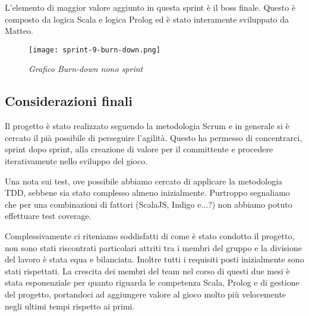 L'elemento di maggior valore aggiunto in questa sprint è il boss finale. Questo è composto da logica Scala e logica Prolog ed è stato interamente sviluppato da Matteo. 

\begin{figure}[H]
    \centering
    \texttt{[image: sprint-9-burn-down.png]}
    \caption{\textit{Grafico Burn-down nono sprint}} 
\end{figure}

\newpage
\subsection{Considerazioni finali}

Il progetto è stato realizzato seguendo la metodologia Scrum e in generale si è cercato il pià possibile di perseguire l'agilità. 
Questo ha permesso di concentrarci, sprint dopo sprint, alla creazione di valore per il committente e procedere iterativamente nello sviluppo del gioco. 

Una nota sui test, ove possibile abbiamo cercato di applicare la metodologia TDD, sebbene sia stato complesso almeno inizialmente. Purtroppo segnaliamo che per una combinazioni di fattori (ScalaJS, Indigo e...?) non abbiamo potuto effettuare test coverage. 

Complessivamente ci riteniamo soddisfatti di come è stato condotto il progetto, non sono stati riscontrati particolari attriti tra i membri del gruppo e la divisione del lavoro è stata equa e bilanciata.
Inoltre tutti i requisiti posti inizialmente sono stati rispettati.
La crescita dei membri del team nel corso di questi due mesi è stata esponenziale per quanto riguarda le competenza Scala, Prolog e di gestione del progetto, portandoci ad aggiungere valore al gioco molto più velocemente negli ultimi tempi rispetto ai primi. 

